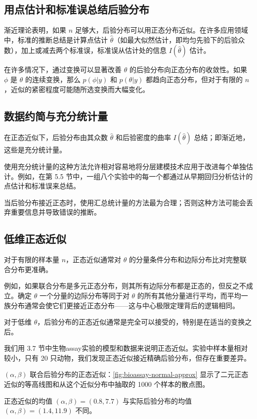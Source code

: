 \subsection{用点估计和标准误总结后验分布}

渐近理论表明，如果 $n$ 足够大，后验分布可以用正态分布近似。在许多应用领域中，标准的推断总结是计算点估计 $\hat{\theta}$（如最大似然估计，即均匀先验下的后验众数），加上或减去两个标准误，标准误从估计处的信息 $I(\hat{\theta})$ 估计。

在许多情况下，通过变换可以显著改善 $\theta$ 的后验分布向正态分布的收敛性。如果 $\phi$ 是 $\theta$ 的连续变换，那么 $p(\phi | y)$ 和 $p(\theta | y)$ 都趋向正态分布，但对于有限的 $n$，近似的紧密程度可能随所选变换而大幅变化。

\subsection{数据约简与充分统计量}

在正态近似下，后验分布由其众数 $\hat{\theta}$ 和后验密度的曲率 $I(\hat{\theta})$ 总结；即渐近地，这些是充分统计量。

使用充分统计量的这种方法允许相对容易地将分层建模技术应用于改进每个单独估计。例如，在第 5.5 节中，一组八个实验中的每一个都通过从早期回归分析估计的点估计和标准误来总结。

当后验分布接近正态时，使用汇总统计量的方法最为合理；否则这种方法可能会丢弃重要信息并导致错误的推断。

\subsection{低维正态近似}

对于有限的样本量 $n$，正态近似通常对 $\theta$ 的分量条件分布和边际分布比对完整联合分布更准确。

例如，如果联合分布是多元正态分布，则其所有边际分布都是正态的，但反之不成立。确定 $\theta$ 一个分量的边际分布等同于对 $\theta$ 的所有其他分量进行平均，而平均一族分布通常会使它们更接近正态分布——这与中心极限定理背后的逻辑相同。

\begin{Remark}
  对于低维 $\theta$，后验分布的正态近似通常是完全可以接受的，特别是在适当的变换之后。
\end{Remark}

\begin{Example}[生物assay实验（续）]
  我们用 3.7 节中生物assay实验的模型和数据来说明正态近似。实验中样本量相对较小，只有 20 只动物，我们发现正态近似接近精确后验分布，但存在重要差异。

  $(\alpha, \beta)$ 联合后验分布的正态近似：\cref{fig:bioassay-normal-approx} 显示了二元正态近似的等高线图和从这个近似分布中抽取的 1000 个样本的散点图。

  正态近似的均值 $(\alpha, \beta) = (0.8, 7.7)$ 与实际后验分布的均值 $(\alpha, \beta) = (1.4, 11.9)$ 不同。
\end{Example}

